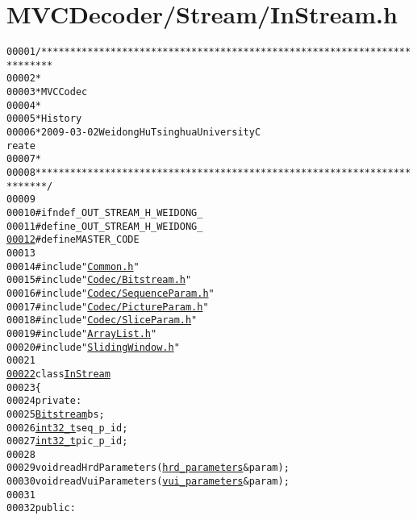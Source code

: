 \hypertarget{_in_stream_8h_source}{
\section{MVCDecoder/Stream/InStream.h}
}


\begin{footnotesize}\begin{alltt}
00001 \textcolor{comment}{/************************************************************************}
00002 \textcolor{comment}{ *}
00003 \textcolor{comment}{ * MVC Codec}
00004 \textcolor{comment}{ * }
00005 \textcolor{comment}{ * History}
00006 \textcolor{comment}{ * 2009-03-02           Weidong Hu              Tsinghua University             C
      reate}
00007 \textcolor{comment}{ * }
00008 \textcolor{comment}{ ************************************************************************/}
00009 
00010 \textcolor{preprocessor}{#ifndef \_OUT\_STREAM\_H\_WEIDONG\_}
00011 \textcolor{preprocessor}{}\textcolor{preprocessor}{#define \_OUT\_STREAM\_H\_WEIDONG\_}
\hypertarget{_in_stream_8h_source_l00012}{}\hyperlink{_in_stream_8h_aac0db9a0280340fa820b89366c85d392}{00012} \textcolor{preprocessor}{}\textcolor{preprocessor}{#define MASTER\_CODE}
00013 \textcolor{preprocessor}{}
00014 \textcolor{preprocessor}{#include "\hyperlink{_common_8h}{Common.h}"}
00015 \textcolor{preprocessor}{#include "\hyperlink{_bitstream_8h}{Codec/Bitstream.h}"}
00016 \textcolor{preprocessor}{#include "\hyperlink{_sequence_param_8h}{Codec/SequenceParam.h}"}
00017 \textcolor{preprocessor}{#include "\hyperlink{_picture_param_8h}{Codec/PictureParam.h}"}
00018 \textcolor{preprocessor}{#include "\hyperlink{_slice_param_8h}{Codec/SliceParam.h}"}
00019 \textcolor{preprocessor}{#include "\hyperlink{_array_list_8h}{ArrayList.h}"}
00020 \textcolor{preprocessor}{#include "\hyperlink{_sliding_window_8h}{SlidingWindow.h}"}
00021 
\hypertarget{_in_stream_8h_source_l00022}{}\hyperlink{class_in_stream}{00022} \textcolor{keyword}{class }\hyperlink{class_in_stream}{InStream}
00023 \{
00024 \textcolor{keyword}{private}:
00025         \hyperlink{struct_bitstream}{Bitstream} bs;
00026         \hyperlink{_types_8h_a115ba3a1b24a8702355c5dbd61ce01e0}{int32_t} seq\_p\_id;
00027         \hyperlink{_types_8h_a115ba3a1b24a8702355c5dbd61ce01e0}{int32_t} pic\_p\_id;
00028 
00029         \textcolor{keywordtype}{void} readHrdParameters(\hyperlink{structhrd__parameters}{hrd_parameters} &param);
00030         \textcolor{keywordtype}{void} readVuiParameters(\hyperlink{structvui__parameters}{vui_parameters} &param);
00031 
00032 \textcolor{keyword}{public}:

\end{alltt}
\end{footnotesize}
